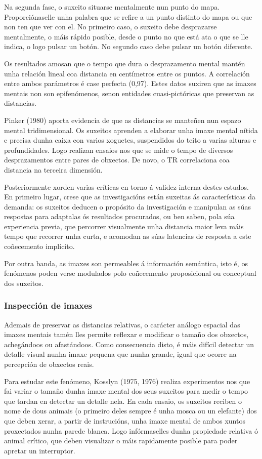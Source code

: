 \documentclass[a4paper,11pt]{article}
\begin{document}
Na segunda fase, o suxeito situarse mentalmente nun punto do mapa. Proporciónaselle unha palabra que se refire a un punto distinto do mapa ou que non ten que ver con el. No primeiro caso, o suxeito debe desprazarse mentalmente, o máis rápido posible, desde o punto no que está ata o que se lle indica, o logo pulsar un botón. No segundo caso debe pulsar un botón diferente.

Os resultados amosan que o tempo que dura o desprazamento mental mantén unha relación lineal coa distancia en centímetros entre os puntos. A correlación entre ambos parámetros é case perfecta (0,97). Estes datos suxiren que as imaxes mentais non son epifenómenos, senon entidades cuasi-pictóricas que preservan as distancias.

Pinker (1980) aporta evidencia de que as distancias se manteñen nun espazo mental tridimensional. Os suxeitos aprenden a elaborar unha imaxe mental nítida e precisa dunha caixa con varios xoguetes, suspendidos do teito a varias alturas e profundidades. Logo realizan ensaios nos que se mide o tempo de diversos desprazamentos entre pares de obxectos. De novo, o TR correlaciona coa distancia na terceira dimensión. 

Posteriormente xorden varias críticas en torno á validez interna destes estudos. En primeiro lugar, crese que as investigacións están suxeitas ás características da demanda: os suxeitos deducen o propósito da investigación e manipulan as súas respostas para adaptalas ós resultados procurados, ou ben saben, pola súa experiencia previa, que percorrer visualmente unha distancia maior leva máis tempo que recorrer unha curta, e acomodan as súas latencias de resposta a este coñecemento implícito.

Por outra banda, as imaxes son permeables á información semántica, isto é, os fenómenos poden verse modulados polo coñecemento proposicional ou conceptual dos suxeitos.

\subsubsection{Inspección de imaxes}
Ademais de preservar as distancias relativas, o carácter análogo espacial das imaxes mentais tamén lles permite reflexar e modificar o tamaño dos obxectos, achegándoos ou afastándoos. Como consecuencia disto, é máis difícil detectar un detalle visual nunha imaxe pequena que nunha grande, igual que ocorre na percepción de obxectos reais. 

Para estudar este fenómeno, Kosslyn (1975, 1976) realiza experimentos nos que fai variar o tamaño dunha imaxe mental dos seus suxeitos para medir o tempo que tardan en detectar un detalle nela. En cada ensaio, os suxeitos reciben o nome de dous animais (o primeiro deles sempre é unha mosca ou un elefante) dos que deben xerar, a partir de instrucións, unha imaxe mental de ambos xuntos proxectados nunha parede blanca. Logo infórmaselles dunha propiedade relativa ó animal crítico, que deben visualizar o máis rapidamente posible para poder apretar un interruptor. 
\end{document}
